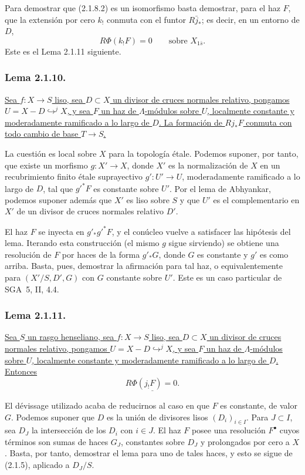 \pageoriginale

Para demostrar que (2.1.8.2) es un isomorfismo basta demostrar, para el haz
$F$, que la extensión por cero $k_!$ conmuta con el funtor $R\bar j_*$; es
decir, en un entorno de $D$,
\[
R\Phi(k_!F)=0\qquad\text{sobre }X_{1\bar s}.
\]
Este es el Lema 2.1.11 siguiente.

\subsubsection*{Lema 2.1.10.}
\underline{Sea $f:X\longrightarrow S$ liso, sea $D\subset X$ un divisor de
cruces normales relativo, pongamos
$U=X-D\mathrel{\mathop{\hookrightarrow}^{j}}X$, y sea $F$ un haz de
$\Lambda$-módulos sobre $U$, localmente constante y moderadamente ramificado
a lo largo de $D$. La formación de $Rj_*F$ conmuta con todo cambio de base
$T\longrightarrow S$.}

La cuestión es local sobre $X$ para la topología étale. Podemos suponer, por
tanto, que existe un morfismo $g:X'\longrightarrow X$, donde $X'$ es la
normalización de $X$ en un recubrimiento finito étale suprayectivo
$g':U'\longrightarrow U$, moderadamente ramificado a lo largo de $D$, tal que
$g'^*F$ es constante sobre $U'$. Por el lema de Abhyankar, podemos suponer
además que $X'$ es liso sobre $S$ y que $U'$ es el complementario en $X'$ de
un divisor de cruces normales relativo $D'$.

El haz $F$ se inyecta en $g'_*g'^*F$, y el conúcleo vuelve a satisfacer las
hipótesis del lema. Iterando esta construcción (el mismo $g$ sigue sirviendo)
se obtiene una resolución de $F$ por haces de la forma $g'_*G$, donde $G$ es
constante y $g'$ es como arriba. Basta, pues, demostrar la afirmación para tal
haz, o equivalentemente para $(X'/S,D',G)$ con $G$ constante sobre $U'$. Este
es un caso particular de SGA~5, II, 4.4.

\subsubsection*{Lema 2.1.11.}
\underline{Sea $S$ un rasgo henseliano, sea $f:X\longrightarrow S$ liso, sea
$D\subset X$ un divisor de cruces normales relativo, pongamos
$U=X-D\mathrel{\mathop{\hookrightarrow}^{j}}X$, y sea $F$ un haz de
$\Lambda$-módulos sobre $U$, localmente constante y moderadamente ramificado
a lo largo de $D$. Entonces}
\[
\underline{R\Phi(j_!F)=0.}
\]

\pageoriginale

El dévissage utilizado acaba de reducirnos al caso en que $F$ es constante,
de valor $G$. Podemos suponer que $D$ es la unión de divisores lisos
$(D_i)_{i\in I}$. Para $J\subset I$, sea $D_J$ la intersección de los $D_i$
con $i\in J$. El haz $F$ posee una resolución $F^\bullet$ cuyos términos son
sumas de haces $G_J$, constantes sobre $D_J$ y prolongados por cero a $X$.
Basta, por tanto, demostrar el lema para uno de tales haces, y esto se sigue
de (2.1.5), aplicado a $D_J/S$.

